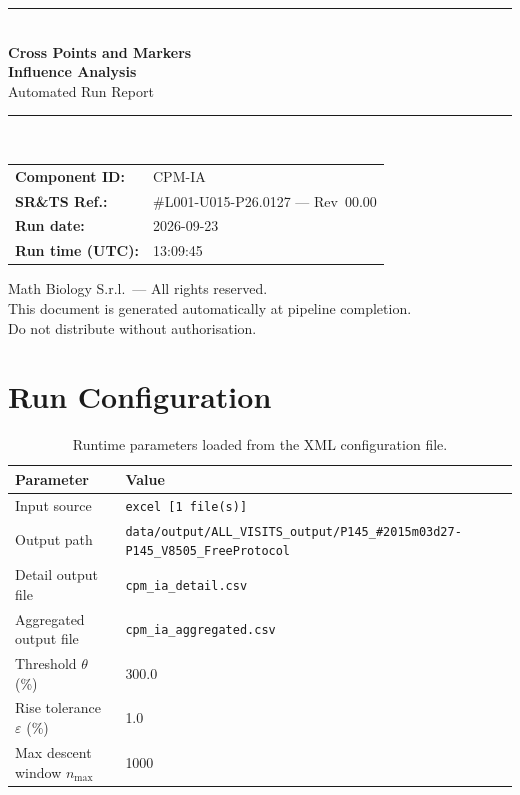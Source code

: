 \documentclass[a4paper,11pt]{article}
\begin{document}
\begin{titlepage}
\begin{center}
  \vspace*{1.8cm}
  {\color{dmaaccent}\rule{\linewidth}{1.5pt}}\\[0.6cm]
  {\LARGE\bfseries\color{dmaaccent}
    Cross Points and Markers\\[0.25cm]
    Influence Analysis}\\[0.4cm]
  {\Large Automated Run Report}\\[0.3cm]
  {\color{dmaaccent}\rule{\linewidth}{1.5pt}}\\[2cm]

  \begin{tabular}{ll}
    \textbf{Component ID:}   & CPM-IA \\[0.3cm]
    \textbf{SR\&TS Ref.:}    & \#L001-U015-P26.0127 --- Rev~00.00 \\[0.3cm]
    \textbf{Run date:}       & 2026-09-23 \\[0.3cm]
    \textbf{Run time (UTC):} & 13:09:45 \\
  \end{tabular}

  \vfill
  {\color{dmagray}\small
    Math Biology S.r.l.\ --- All rights reserved.\\
    This document is generated automatically at pipeline completion.\\
    Do not distribute without authorisation.}
\end{center}
\end{titlepage}

\tableofcontents
\clearpage

\section{Run Configuration}

\begin{table}[h!]
\centering
\small
\caption{Runtime parameters loaded from the XML configuration file.}
\begin{tabular}{ll}
\toprule
\textbf{Parameter} & \textbf{Value} \\
\midrule
Input source                      & \texttt{excel [1 file(s)]} \\
Output path                       & \texttt{data/output/ALL\_VISITS\_output/P145\_\#2015m03d27-P145\_V8505\_FreeProtocol} \\
Detail output file                & \texttt{cpm\_ia\_detail.csv} \\
Aggregated output file            & \texttt{cpm\_ia\_aggregated.csv} \\
Threshold $\theta$ (\%)           & 300.0 \\
Rise tolerance $\varepsilon$ (\%) & 1.0 \\
Max descent window $n_{\max}$     & 1000 \\
\bottomrule
\end{tabular}
\end{table}
\end{document}
